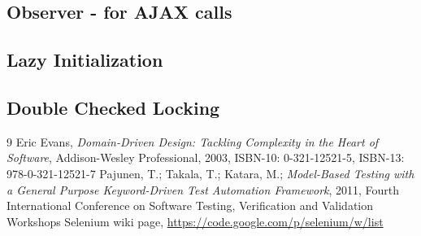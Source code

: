 \documentclass[12pt,twoside]{article}
\begin{document}
\subsection{Observer - for AJAX calls}

\subsection{Lazy Initialization}
\subsection{Double Checked Locking}




\begin{thebibliography} {9}
 Eric Evans, {\sl Domain-Driven Design: Tackling Complexity in the Heart of Software}, Addison-Wesley Professional, 2003, ISBN-10: 0-321-12521-5, ISBN-13: 978-0-321-12521-7
 Pajunen, T.; Takala, T.; Katara, M.; {\sl Model-Based Testing with a General Purpose Keyword-Driven Test Automation Framework}, 2011, Fourth International Conference on Software Testing, Verification and Validation Workshops
 Selenium wiki page, \url{https://code.google.com/p/selenium/w/list}
\end{thebibliography}
\end{document}
